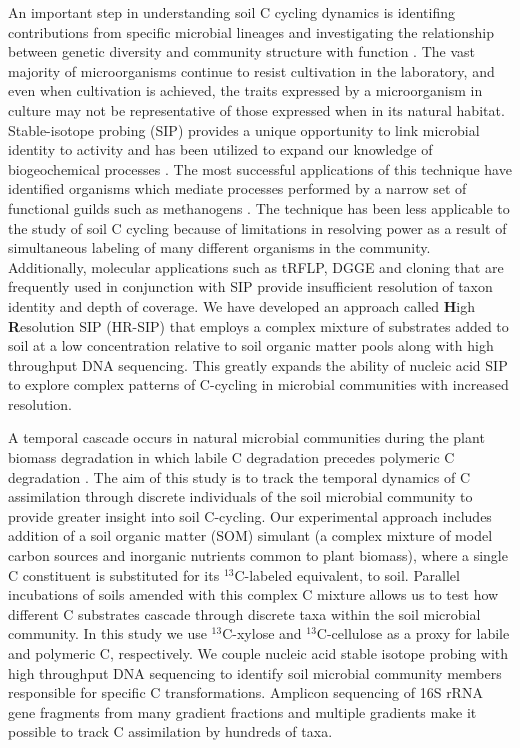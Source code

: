 An important step in understanding soil C cycling dynamics is identifing
contributions from specific microbial lineages and investigating the
relationship between genetic diversity and community structure with function
\citep{O_Donnell_2002}. The vast majority of microorganisms continue to resist
cultivation in the laboratory, and even when cultivation is achieved, the
traits expressed by a microorganism in culture may not be representative of
those expressed when in its natural habitat. Stable-isotope probing (SIP)
provides a unique opportunity to link microbial identity to activity and has
been utilized to expand our knowledge of biogeochemical processes
\citep{Chen_Murrell_2010}. The most successful applications of this technique
have identified organisms which mediate processes performed by a narrow set of
functional guilds such as methanogens \citep{Lu_2005}. The technique has been
less applicable to the study of soil C cycling because of limitations in
resolving power as a result of simultaneous labeling of many different
organisms in the community. Additionally, molecular applications such as tRFLP,
DGGE and cloning that are frequently used in conjunction with SIP provide
insufficient resolution of taxon identity and depth of coverage. We have
developed an approach called \textbf{H}igh \textbf{R}esolution SIP (HR-SIP)
that employs a complex mixture of substrates added to soil at a low
concentration relative to soil organic matter pools along with high throughput
DNA sequencing. This greatly expands the ability of nucleic acid SIP to explore
complex patterns of C-cycling in microbial communities with increased
resolution.

A temporal cascade occurs in natural microbial communities during the plant
biomass degradation in which labile C degradation precedes polymeric C
degradation \citep{Hu_1997,Rui_2009}.  The aim of this study is to track the
temporal dynamics of C assimilation through discrete individuals of the soil
microbial community to provide greater insight into soil C-cycling.  Our
experimental approach includes addition of a soil organic matter (SOM) simulant
(a complex mixture of model carbon sources and inorganic nutrients common to
plant biomass), where a single C constituent is substituted for its
$^{13}$C-labeled equivalent, to soil.  Parallel incubations of soils amended
with this complex C mixture allows us to test how different C substrates
cascade through discrete taxa within the soil microbial community.  In this
study we use $^{13}$C-xylose and $^{13}$C-cellulose as a proxy for labile and
polymeric C, respectively.  We couple nucleic acid stable isotope probing with
high throughput DNA sequencing to identify soil microbial community members
responsible for specific C transformations.  Amplicon sequencing of 16S rRNA
gene fragments from many gradient fractions and multiple gradients make it
possible to track C assimilation by hundreds of taxa.
